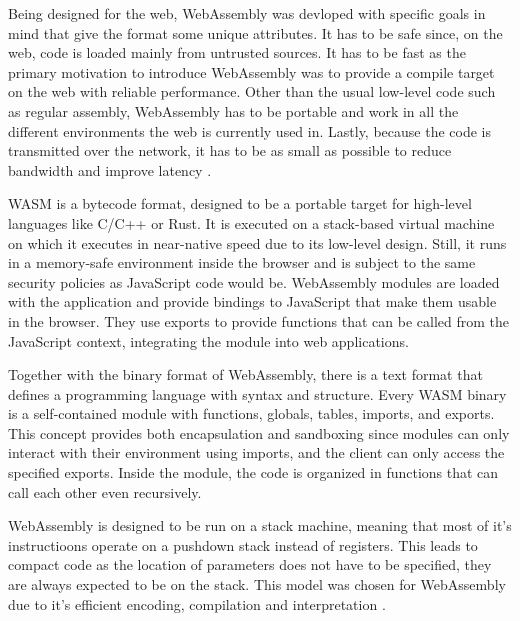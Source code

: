 
Being designed for the web, WebAssembly was devloped with specific goals in mind that give the format some unique attributes. It has to be safe since, on the web, code is loaded mainly from untrusted sources. It has to be fast as the primary motivation to introduce WebAssembly was to provide a compile target on the web with reliable performance. Other than the usual low-level code such as regular assembly, WebAssembly has to be portable and work in all the different environments the web is currently used in. Lastly, because the code is transmitted over the network, it has to be as small as possible to reduce bandwidth and improve latency \autocite{rossberg_bringing_2018}.

WASM is a bytecode format, designed to be a portable target for high-level languages like C/C++ or Rust. It is executed on a stack-based virtual machine on which it executes in near-native speed due to its low-level design. Still, it runs in a memory-safe environment inside the browser and is subject to the same security policies as JavaScript code would be. WebAssembly modules are loaded with the application and provide bindings to JavaScript that make them usable in the browser. They use exports to provide functions that can be called from the JavaScript context, integrating the module into web applications.

Together with the binary format of WebAssembly, there is a text format that defines a programming language with syntax and structure. Every WASM binary is a self-contained module with functions, globals, tables, imports, and exports. This concept provides both encapsulation and sandboxing since modules can only interact with their environment using imports, and the client can only access the specified exports. Inside the module, the code is organized in functions that can call each other even recursively.

WebAssembly is designed to be run on a stack machine, meaning that most of it's instructioons operate on a pushdown stack instead of registers. This leads to compact code as the location of parameters does not have to be specified, they are always expected to be on the stack. This model was chosen for WebAssembly due to it's efficient encoding, compilation and interpretation \autocite{noauthor_design_nodate}.

